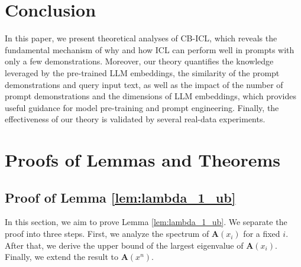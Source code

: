 \documentclass{article} %
\theoremstyle{plain} %
\begin{document}
\section{Conclusion}
In this paper, we present theoretical analyses of CB-ICL, which reveals the fundamental mechanism of why and how ICL can perform well in prompts with only a few demonstrations. Moreover, our theory quantifies the knowledge leveraged by the pre-trained LLM embeddings, the similarity of the prompt demonstrations and query input text, as well as the impact of the number of prompt demonstrations and the dimensions of LLM embeddings, which provides useful guidance for model pre-training and prompt engineering. Finally, the effectiveness of our theory is validated by several real-data experiments.





\appendix
\section{Proofs of Lemmas and Theorems}

\subsection{Proof of Lemma \ref{lem:lambda_1_ub}}\label{append:lemma1_proof}

In this section, we aim to prove Lemma \ref{lem:lambda_1_ub}. We separate the proof into three steps. First, we analyze the spectrum of $\textbf{A}(x_i)$ for a fixed $i$. After that, we derive the upper bound of the largest eigenvalue of $\textbf{A}(x_i)$. Finally, we extend the result to $\textbf{A}(x^n)$.
\end{document}
